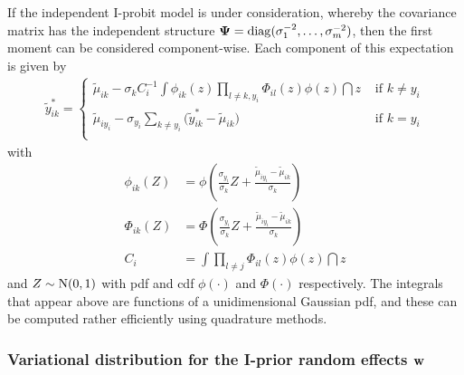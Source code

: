 If the independent I-probit model is under consideration, whereby the covariance matrix has the independent structure ${\bm\Psi} = \operatorname{diag}(\sigma_1^{-2},\dots,\sigma_m^{-2})$, then the first moment  can be considered component-wise. 
Each component of this expectation is given by
\begin{align}\label{eq:ystarupdate}
  \tilde y_{ik}^* =
  \begin{cases}
    \tilde\mu_{ik} - \sigma_k C_i^{-1} \displaystyle{  \int \phi_{ik}(z) \prod_{l \neq k,y_i} \Phi_{il}(z) \phi(z) \dint z }
    &\text{ if } k \neq y_i \\[1.5em]
    \tilde\mu_{iy_i} - \sigma_{y_i} \sum_{k \neq y_i} \big(\tilde y_{ik}^* -  \tilde\mu_{ik} \big) 
    &\text{ if } k = y_i \\
  \end{cases}
\end{align}
with 
\vspace{-1em}
\begin{align*}
  \phi_{ik}(Z) &= \phi \left(\frac{\sigma_{y_i}}{\sigma_k} Z + \frac{\tilde\mu_{iy_i} - \tilde\mu_{ik}}{\sigma_k} \right) \\
  \Phi_{ik}(Z) &= \Phi \left(\frac{\sigma_{y_i}}{\sigma_k} Z + \frac{\tilde\mu_{iy_i} - \tilde\mu_{ik}}{\sigma_k} \right) \\
  C_i &= \int \prod_{l \neq j} \Phi_{il}(z) \phi(z) \dint z
\end{align*}
and $Z \sim \operatorname{N}(0,1)$ with pdf and cdf $\phi(\cdot)$ and $\Phi(\cdot)$ respectively. 
The integrals that appear above are functions of a unidimensional Gaussian pdf, and these can be computed rather efficiently using quadrature methods.
\vspace{-0.3em}

\subsubsection{Variational distribution for the I-prior random effects \texorpdfstring{${\mathbf w}$}{$w$}}

